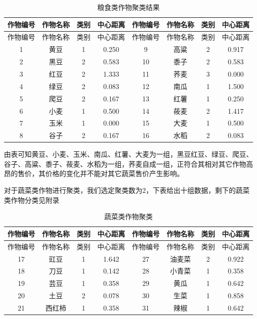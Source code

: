 \documentclass[withoutpreface,bwprint]{cumcmthesis} %
\begin{document}
\begin{longtable}{|c|c|c|c|c|c|c|c|}
	\caption{粮食类作物聚类结果} \\
	\hline
	作物编号 & 作物名称 & 类别 & 中心距离& 作物编号 & 作物名称 & 类别 & 中心距离 \\
	\endfirsthead
	
	\hline
	作物编号 & 作物名称 & 类别 & 中心距离&作物编号 & 作物名称 & 类别 & 中心距离  \\
	\hline
	\endhead
	
	\hline
	\endfoot
	
	\hline
	\endlastfoot
	
	1 & 黄豆 & 1 & 0.250 &	9 & 高粱 & 2 & 0.917 \\
	2 & 黑豆 & 2 & 0.583 &	10 & 黍子 & 2 & 0.583 \\
	3 & 红豆 & 2 & 1.333 &	11 & 荞麦 & 3 & 0.000 \\
	4 & 绿豆 & 2 & 0.083 &	12 & 南瓜 & 1 & 1.500 \\
	5 & 爬豆 & 2 & 0.167 &	13 & 红薯 & 1 & 0.250 \\
	6 & 小麦 & 1 & 0.500 &	14 & 莜麦 & 2 & 1.417 \\
	7 & 玉米 & 1 & 0.000 &	15 & 大麦 & 1 & 0.500 \\
	8 & 谷子 & 2 & 0.167 &
	16 & 水稻 & 2 & 0.083 \\

\end{longtable}

由表可知黄豆、小麦、玉米、南瓜、红薯、大麦为一组，黑豆红豆、绿豆、爬豆、谷子、高粱、黍子、莜麦、水稻为一组，荞麦自成一组，正符合其相对其它作物高昂的售价，其价格的变化并不能对其它蔬菜售价产生影响。


对于蔬菜类作物进行聚类，我们选定聚类数为2，下表给出十组数据，剩下的蔬菜类作物分类见附录
\begin{longtable}{|c|c|c|c|c|c|c|c|}
	\caption{蔬菜类作物聚类}  \\
	\hline
	作物编号 & 作物名称 & 类别 & 中心距离&作物编号 & 作物名称 & 类别 & 中心距离  \\
	\hline
	\endfirsthead
	
	\hline
	作物编号 & 作物名称 & 类别 & 中心距离&作物编号 & 作物名称 & 类别 & 中心距离  \\
	\hline
	\endhead
	
	\hline
	\endfoot
	
	\hline
	\endlastfoot
	
	17 & 豇豆 & 1 & 1.642 &27 & 油麦菜 & 2 & 0.922 \\
	18 & 刀豆 & 1 & 0.142 &	28 & 小青菜 & 1 & 0.358 \\
	19 & 芸豆 & 1 & 0.358 &	29 & 黄瓜 & 1 & 0.642 \\
	20 & 土豆 & 2 & 0.078 &30 & 生菜 & 1 & 0.858 \\
	21 & 西红柿 & 1 & 0.358 &	31 & 辣椒 & 1 & 0.642 \\
\end{longtable}
\end{document}
